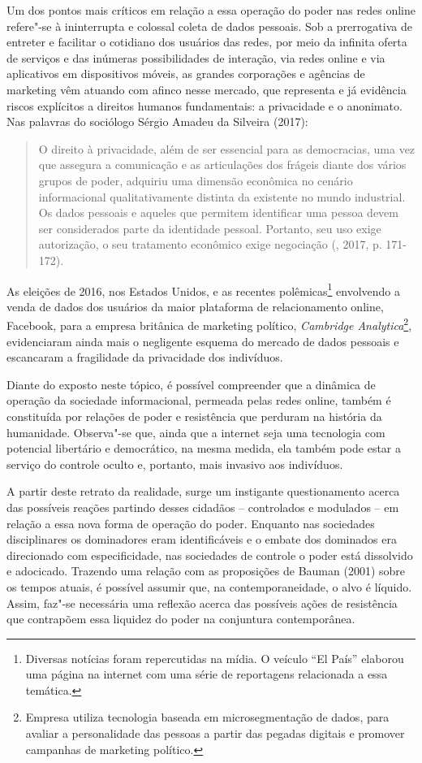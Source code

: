 Um dos pontos mais críticos em relação a essa operação do poder nas
redes online refere"-se à ininterrupta e colossal coleta de dados
pessoais. Sob a prerrogativa de entreter e facilitar o cotidiano dos
usuários das redes, por meio da infinita oferta de serviços e das
inúmeras possibilidades de interação, via redes online e via aplicativos
em dispositivos móveis, as grandes corporações e agências de marketing
vêm atuando com afinco nesse mercado, que representa e já evidência
riscos explícitos a direitos humanos fundamentais: a privacidade e o
anonimato. Nas palavras do sociólogo Sérgio Amadeu da Silveira (2017):

\begin{quote}
O direito à privacidade, além de ser essencial para as democracias, uma
vez que assegura a comunicação e as articulações dos frágeis diante dos
vários grupos de poder, adquiriu uma dimensão econômica no cenário
informacional qualitativamente distinta da existente no mundo
industrial. Os dados pessoais e aqueles que permitem identificar uma
pessoa devem ser considerados parte da identidade pessoal. Portanto, seu
uso exige autorização, o seu tratamento econômico exige negociação (, 2017, p. 171-172).
\end{quote}

As eleições de 2016, nos Estados Unidos, e as recentes
polêmicas\footnote{Diversas notícias foram repercutidas na mídia. O
  veículo ``El País'' elaborou uma página na internet com uma série de
  reportagens relacionada a essa temática.} envolvendo a venda de dados
dos usuários da maior plataforma de relacionamento online, Facebook,
para a empresa britânica de marketing político, \emph{Cambridge
Analytica}\footnote{Empresa utiliza tecnologia baseada em
  microsegmentação de dados, para avaliar a personalidade das pessoas a
  partir das pegadas digitais e promover campanhas de marketing
  político.}, evidenciaram ainda mais o negligente esquema do
mercado de dados pessoais e escancaram a fragilidade da privacidade dos
indivíduos.

Diante do exposto neste tópico, é possível compreender que a dinâmica de
operação da sociedade informacional, permeada pelas redes online, também
é constituída por relações de poder e resistência que perduram na
história da humanidade. Observa"-se que, ainda que a internet seja uma
tecnologia com potencial libertário e democrático, na mesma medida, ela
também pode estar a serviço do controle oculto e, portanto, mais
invasivo aos indivíduos.

A partir deste retrato da realidade, surge um instigante questionamento
acerca das possíveis reações partindo desses cidadãos -- controlados e
modulados -- em relação a essa nova forma de operação do poder. Enquanto
nas sociedades disciplinares os dominadores eram identificáveis e o
embate dos dominados era direcionado com especificidade, nas sociedades
de controle o poder está dissolvido e adocicado. Trazendo uma relação
com as proposições de Bauman (2001) sobre os tempos atuais, é possível
assumir que, na contemporaneidade, o alvo é líquido. Assim, faz"-se
necessária uma reflexão acerca das possíveis ações de resistência que
contrapõem essa liquidez do poder na conjuntura contemporânea.

